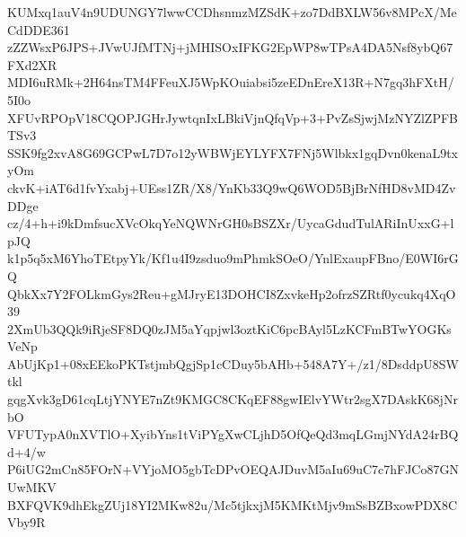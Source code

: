KUMxq1auV4n9UDUNGY7lwwCCDhsnmzMZSdK+zo7DdBXLW56v8MPcX/MeCdDDE361
zZZWsxP6JPS+JVwUJfMTNj+jMHISOxIFKG2EpWP8wTPsA4DA5Nsf8ybQ67FXd2XR
MDI6uRMk+2H64nsTM4FFeuXJ5WpKOuiabsi5zeEDnEreX13R+N7gq3hFXtH/5I0o
XFUvRPOpV18CQOPJGHrJywtqnIxLBkiVjnQfqVp+3+PvZsSjwjMzNYZlZPFBTSv3
SSK9fg2xvA8G69GCPwL7D7o12yWBWjEYLYFX7FNj5Wlbkx1gqDvn0kenaL9txyOm
ckvK+iAT6d1fvYxabj+UEss1ZR/X8/YnKb33Q9wQ6WOD5BjBrNfHD8vMD4ZvDDge
cz/4+h+i9kDmfsucXVcOkqYeNQWNrGH0sBSZXr/UycaGdudTulARiInUxxG+lpJQ
k1p5q5xM6YhoTEtpyYk/Kf1u4I9zsduo9mPhmkSOeO/YnlExaupFBno/E0WI6rGQ
QbkXx7Y2FOLkmGys2Reu+gMJryE13DOHCI8ZxvkeHp2ofrzSZRtf0ycukq4XqO39
2XmUb3QQk9iRjeSF8DQ0zJM5aYqpjwl3oztKiC6pcBAyl5LzKCFmBTwYOGKsVeNp
AbUjKp1+08xEEkoPKTstjmbQgjSp1cCDuy5bAHb+548A7Y+/z1/8DsddpU8SWtkl
gqgXvk3gD61cqLtjYNYE7nZt9KMGC8CKqEF88gwIElvYWtr2sgX7DAskK68jNrbO
VFUTypA0nXVTlO+XyibYns1tViPYgXwCLjhD5OfQeQd3mqLGmjNYdA24rBQd+4/w
P6iUG2mCn85FOrN+VYjoMO5gbTcDPvOEQAJDuvM5aIu69uC7c7hFJCo87GNUwMKV
BXFQVK9dhEkgZUj18YI2MKw82u/Mc5tjkxjM5KMKtMjv9mSsBZBxowPDX8CVby9R
